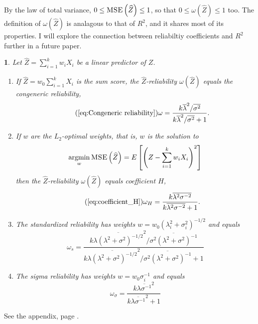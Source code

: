 \documentclass{article}
\makeatletter
\theoremstyle{plain}
\theoremstyle{plain}
\theoremstyle{definition}
\theoremstyle{remark}
\theoremstyle{definition}
\theoremstyle{plain}
\theoremstyle{plain}
\newtheorem{prop}[thm]{\protect\propositionname}
\theoremstyle{definition}
\newenvironment{proof}[1][\protect\proofname]{\par
	\normalfont\topsep6\p@\@plus6\p@\relax
	\trivlist
	\itemindent\parindent
	\item[\hskip\labelsep\scshape #1]\ignorespaces
}{%
	\endtrivlist\@endpefalse
}
\providecommand{\proofname}{Proof}
\providecommand{\propositionname}{Proposition}
\DeclareMathOperator{\argmin}{argmin}
\makeatother
\begin{document}
By the law of total variance, $0\leq\textsc{MSE}\left(\widehat{Z}\right)\leq1$,
so that $0\leq\omega\left(\widehat{Z}\right)\leq1$ too. The definition
of $\omega(\widehat{Z})$ is analagous to that of $R^{2}$, and it
shares most of its properties. I will explore the connection between
reliabiltiy coefficients and $R^{2}$ further in a future paper.
\begin{prop}
\label{prop:Z-reliabiltiy}Let $\widehat{Z}=\sum_{i=1}^{k}w_{i}X_{i}$
be a linear predictor of $Z$.

\begin{enumerate}[label=(\roman*)]
\item If $\widehat{Z}=w_{0}\sum_{i=1}^{k}X_{i}$ is the sum score, the $\widehat{Z}$-reliability
$\omega\left(\widehat{Z}\right)$ equals the congeneric reliability,
\begin{equation}
\tag{\ref{eq:Congeneric reliability}}
\omega=\frac{k\overline{\lambda}^{2}/\overline{\sigma^{2}}}{k\overline{\lambda}^{2}/\overline{\sigma^{2}}+1}.
\end{equation}
\item If $w$ are the $L_{2}$-optimal weights, that is, $w$ is the solution
to
\[
\argmin_{w}\textsc{MSE}\left(\widehat{Z}\right)=E\left[\left(Z-\sum_{i=1}^{k}w_{i}X_{i}\right)^{2}\right]
\]
then the $\widehat{Z}$-reliability $\omega\left(\widehat{Z}\right)$
equals coefficient $H$,
\begin{equation}
\tag{\ref{eq:coefficient_H}}
\omega_{H}=\frac{k\overline{\lambda^{2}\sigma^{-2}}}{k\overline{\lambda^{2}\sigma^{-2}}+1}.
\end{equation}
\item The standardized reliability has weights $w=w_{0}(\lambda_{i}^{2}+\sigma_{i}^{2})^{-1/2}$ and equals
\begin{equation}
\omega_s=\frac{k\overline{\lambda(\lambda^{2}+\sigma^{2})^{-1/2}}^{2}/\overline{\sigma^{2}(\lambda^{2}+\sigma^{2})^{-1}}}{k\overline{\lambda(\lambda^{2}+\sigma^{2})^{-1/2}}^{2}/\overline{\sigma^{2}(\lambda^{2}+\sigma^{2})^{-1}}+1}\label{eq:Standardized reliability}
\end{equation}
\item The sigma reliability has weights $w=w_{0}\sigma_{i}^{-1}$ and equals
\begin{equation}
\omega_\sigma=\frac{k\overline{\lambda\sigma^{-1}}^{2}}{k\overline{\lambda\sigma^{-1}}^{2}+1}\label{eq:Sigma-standardized reliability}
\end{equation}
\end{enumerate}
\end{prop}
\begin{proof}
See the appendix, page \pageref{proof:Z-reliability}.
\end{proof}
\end{document}

